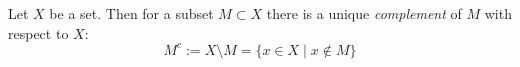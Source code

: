 \begin{Definition}
\end{Definition}

\begin{Definition}
  Let $X$ be a set. Then for a
  subset $M \subset X$ there is a unique \emph{complement}
  of $M$ with respect to $X$:
  	$$
  	M^c := X \setminus M = \{ x \in X \mid x \notin M \}
  	$$
\end{Definition}

